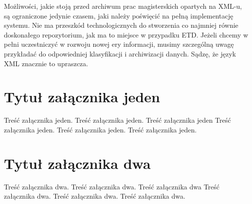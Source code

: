 \documentclass[brudnopis,xodstep]{xmgr}
\begin{document}
%
\summary
Możliwości, jakie stoją przed archiwum prac magisterskich opartych na
XML-u, są ograniczone jedynie czasem, jaki należy poświęcić na pełną
implementację systemu. Nie ma przeszkód technologicznych do stworzenia
co najmniej równie doskonałego repozytorium, jak ma to miejsce w
przypadku ETD. Jeżeli chcemy w pełni uczestniczyć w rozwoju nowej ery
informacji, musimy szczególną uwagę przykładać do odpowiedniej
klasyfikacji i archiwizacji danych. Sądzę, że język XML znacznie to
upraszcza.

%
\appendix
\chapter{Tytuł załącznika jeden}

Treść załącznika jeden. Treść załącznika jeden. Treść załącznika jeden
Treść załącznika jeden. Treść załącznika jeden.
Treść załącznika jeden.

\chapter{Tytuł załącznika dwa}

Treść załącznika dwa. Treść załącznika dwa. Treść załącznika dwa
Treść załącznika dwa. Treść załącznika dwa.
Treść załącznika dwa.
\end{document}
